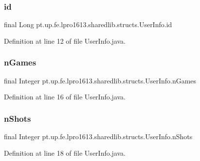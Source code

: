 \subsubsection{\texorpdfstring{id}{id}}
{\footnotesize\ttfamily final Long pt.\+up.\+fe.\+lpro1613.\+sharedlib.\+structs.\+User\+Info.\+id}



Definition at line 12 of file User\+Info.\+java.

\hypertarget{classpt_1_1up_1_1fe_1_1lpro1613_1_1sharedlib_1_1structs_1_1_user_info_aa6fdbbe716d5d8b142de95e2ef21665f}{}\label{classpt_1_1up_1_1fe_1_1lpro1613_1_1sharedlib_1_1structs_1_1_user_info_aa6fdbbe716d5d8b142de95e2ef21665f} 
\subsubsection{\texorpdfstring{n\+Games}{nGames}}
{\footnotesize\ttfamily final Integer pt.\+up.\+fe.\+lpro1613.\+sharedlib.\+structs.\+User\+Info.\+n\+Games}



Definition at line 16 of file User\+Info.\+java.

\hypertarget{classpt_1_1up_1_1fe_1_1lpro1613_1_1sharedlib_1_1structs_1_1_user_info_ae5f52d2e164a1ae282e005f4f9ec1a5c}{}\label{classpt_1_1up_1_1fe_1_1lpro1613_1_1sharedlib_1_1structs_1_1_user_info_ae5f52d2e164a1ae282e005f4f9ec1a5c} 
\subsubsection{\texorpdfstring{n\+Shots}{nShots}}
{\footnotesize\ttfamily final Integer pt.\+up.\+fe.\+lpro1613.\+sharedlib.\+structs.\+User\+Info.\+n\+Shots}



Definition at line 18 of file User\+Info.\+java.

\hypertarget{classpt_1_1up_1_1fe_1_1lpro1613_1_1sharedlib_1_1structs_1_1_user_info_aa9385a8d0f058c3ffdaad18496497443}{}\label{classpt_1_1up_1_1fe_1_1lpro1613_1_1sharedlib_1_1structs_1_1_user_info_aa9385a8d0f058c3ffdaad18496497443} 
